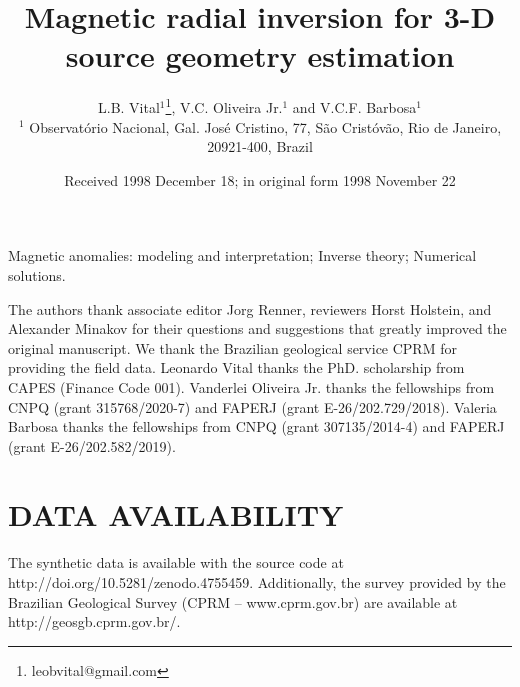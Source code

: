 \documentclass[extra,mreferee]{gji}
\title[Geophys.\ J.\ Int.: Magnetic radial inversion]
  {Magnetic radial inversion for 3-D source geometry estimation}
\author[L.B. Vital, V.C. Oliveira Jr. and V.C.F. Barbosa]
  {L.B. Vital$^1$\thanks{leobvital@gmail.com}, 
  V.C. Oliveira Jr.$^1$ and V.C.F. Barbosa$^1$\\
  $^1$ Observat{\'o}rio Nacional, Gal. Jos{\'e} Cristino, 77, São Crist{\'o}v{\~a}o,
  Rio de Janeiro, 20921-400, Brazil
  }
\date{Received 1998 December 18; in original form 1998 November 22}
\begin{document}
\label{firstpage}

\maketitle



\begin{keywords}
 Magnetic anomalies: modeling and interpretation; Inverse theory; Numerical solutions.
\end{keywords}











\begin{acknowledgments}
The authors thank associate editor Jorg Renner, reviewers Horst Holstein, and Alexander Minakov 
for their questions and suggestions that greatly improved the original manuscript.	
We thank the Brazilian geological service CPRM for providing the field data. 
Leonardo Vital thanks the PhD. scholarship from CAPES (Finance Code 001). 
Vanderlei Oliveira Jr. thanks the fellowships from CNPQ (grant 315768/2020-7) and 
FAPERJ (grant E-26/202.729/2018).  
Valeria Barbosa thanks the fellowships from CNPQ (grant 307135/2014-4) and 
FAPERJ (grant E-26/202.582/2019).
\end{acknowledgments}

\section*{DATA AVAILABILITY}

The synthetic data is available with the source code at http://doi.org/10.5281/zenodo.4755459. Additionally, the survey provided by the Brazilian Geological Survey (CPRM – www.cprm.gov.br) are available at http://geosgb.cprm.gov.br/.






\appendix

\label{lastpage}
\end{document}
